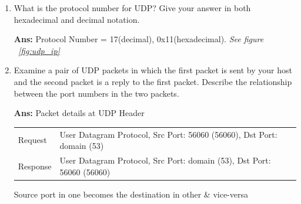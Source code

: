 \documentclass[a4,11pt]{article}
\newenvironment{que}
{ \color{YellowGreen}
  \begin{question}
}
{ \end{question} }
\newenvironment{sol}
{ \color{Black}
  \begin{solution}
}
{ \end{solution} }
\begin{document}
\begin{enumerate}
   
  \item
  \begin{que}
   What is the protocol number for UDP? Give your answer in both hexadecimal and decimal notation. 
  \end{que}

  \begin{sol}
   \textbf{Ans:}  Protocol Number =  17(decimal), 0x11(hexadecimal). \textit{ See figure ~\ref{fig:udp_ip}}
  \end{sol}

  
  \item
  \begin{que}
   Examine a pair of UDP packets in which the first packet is sent by your host and the second packet is a reply to the first packet. 
   Describe the relationship between the port numbers in the two packets.
  \end{que}

  \begin{sol}
  \textbf{Ans:} Packet details at UDP Header \\
   \begin{tabular}{|l|l|}
   \hline
      Request&	  User Datagram Protocol, Src Port: 56060 (56060), Dst Port: domain (53)\\
      Response&	  User Datagram Protocol, Src Port: domain (53), Dst Port: 56060 (56060) \\
      \hline
   \end{tabular}
   
  Source port in one becomes the destination in other \& vice-versa       
  \end{sol}

  \end{enumerate} 
  
\end{document}
